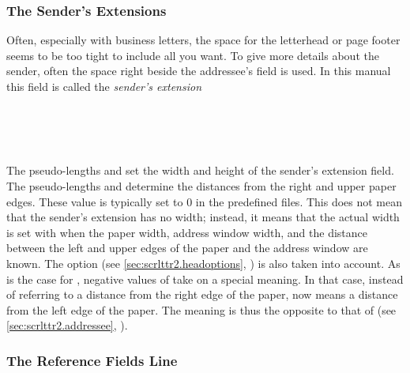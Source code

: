 \subsubsection{The Sender's Extensions}
\label{sec:scrlttr2-experts.locationField}

Often, especially with business letters, the space for the letterhead
or page footer seems to be too tight to include all you want. To give
more details about the sender, often the space right beside the
addressee's field is used. In this manual this field is called the
\emph{sender's extension}


\begin{Declaration}
  \\
  \\
  \\
\end{Declaration}
%
%
%
%
The pseudo-lengths  and
 set the width
and height of the sender's extension field. The pseudo-lengths
 and  determine the distances from
the right and upper paper edges. These value is typically set to
0 in the predefined  files. This does not mean that
the sender's extension has no width; instead, it means that the actual
width is set with  when the paper width, address window
width, and the distance between the left and upper edges of the paper
and the address window are known. The option  (see
\autoref{sec:scrlttr2.headoptions},
) is also taken into
account. As is the case for , negative values of
 take on a special meaning. In that case, instead of
referring to a distance from the right edge of the paper,
 now means a distance from the left edge of the
paper. The meaning is thus the opposite to that of
 (see \autoref{sec:scrlttr2.addressee},
).
%
%
%
%


%


\subsubsection{The Reference Fields Line}
\label{sec:scrlttr2-experts.refLine}
%

